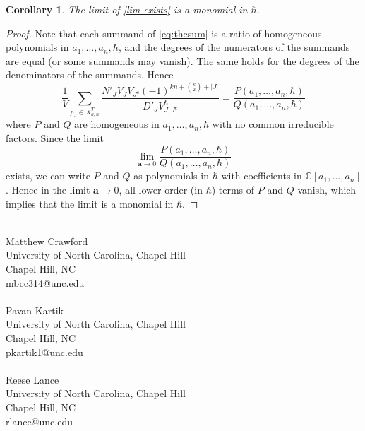 \documentclass[12 pt]{article}
\theoremstyle{plain}
\theoremstyle{plain}
\theoremstyle{plain}
\newtheorem{corollary}{Corollary}[section]
\theoremstyle{plain}
\theoremstyle{plain}
\theoremstyle{plain}
\theoremstyle{plain}
\theoremstyle{plain}
\theoremstyle{plain}
\theoremstyle{plain}
\theoremstyle{remark}
\theoremstyle{remark}
\theoremstyle{definition}
\theoremstyle{definition}
\theoremstyle{definition}
\theoremstyle{definition}
\theoremstyle{definition}
\theoremstyle{definition}
\begin{document}
\begin{corollary}\label{limit monomial}
    The limit of \ref{lim-exists} is a monomial in $\hbar$.
\end{corollary}
\begin{proof}Note that each summand of \ref{eq:thesum} is a ratio of homogeneous polynomials in $a_{1},\dots,a_{n},\hbar$, and the degrees of the numerators of the summands are equal (or some summands may vanish). The same holds for the degrees of the denominators of the summands. Hence
\[\frac{1}{V}\sum_{p_{J}\in X_{k,n}^{T}}\frac{N'_{J}V_{J}V_{J^{c}}(-1)^{kn+\binom{k}{2}+|J|}}{D'_{J}V_{J,J^{c}}^{\hbar}}=\frac{P(a_{1},\dots,a_{n},\hbar)}{Q(a_{1},\dots,a_{n},\hbar)}\]
where $P$ and $Q$ are homogeneous in $a_{1},\dots,a_{n},\hbar$ with no common irreducible factors. Since the limit 
\[\lim_{\mathbf{a}\to 0}\frac{P(a_{1},\dots,a_{n},\hbar)}{Q(a_{1},\dots,a_{n},\hbar)}\]
exists, we can write $P$ and $Q$ as polynomials in $\hbar$ with coefficients in $\mathbb{C}[a_{1},\dots,a_{n}]$. Hence in the limit $\mathbf{a}\to 0$, all lower order (in $\hbar$) terms of $P$ and $Q$ vanish, which implies that the limit is a monomial in $\hbar$.
\end{proof}
\newpage
\printbibliography
\hfill\\
\noindent
Matthew Crawford\\
University of North Carolina, Chapel Hill\\
Chapel Hill, NC\\
mbcc314@unc.edu
\\\\
Pavan Kartik\\
University of North Carolina, Chapel Hill\\
Chapel Hill, NC\\
pkartik1@unc.edu
\\\\
Reese Lance\\
University of North Carolina, Chapel Hill\\
Chapel Hill, NC\\
rlance@unc.edu
\end{document}
